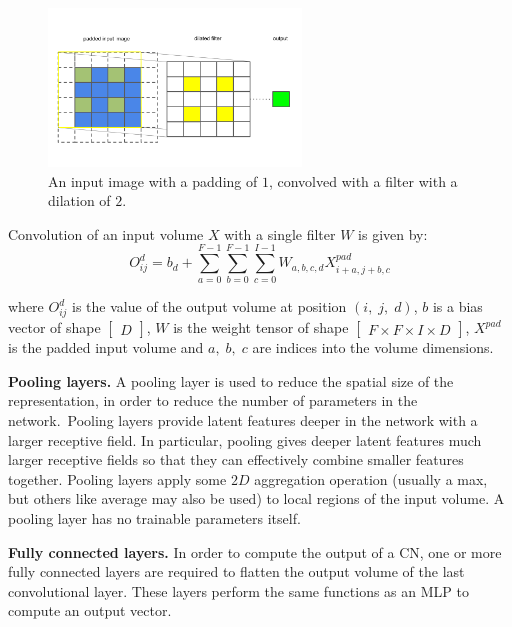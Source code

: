 \begin{figure}[H]
   	\centering
    	\includegraphics[width=0.6\textwidth, height=0.3\textwidth]{padding_and_dilation}
	\captionsetup{justification=centering}
	\caption{An input image with a padding of $ 1 $, convolved with a filter with a dilation of $ 2 $.}
\end{figure}

\noindent Convolution of an input volume $ X $ with a single filter $ W $ is given by: 
\begin{equation}
	O_{ij}^{d} = b_d + \sum_{a=0}^{F - 1}\sum_{b=0}^{F - 1}\sum_{c=0}^{I - 1}W_{a,b,c,d}X_{i+a,j+b,c}^{pad}
\end{equation}

\noindent where $ O_{ij}^d $ is the value of the output volume at position $ (i, \; j, \; d) $, $ b $ is a bias vector of shape $\left [ \begin{matrix} D \end{matrix} \right]$, $ W $ is the weight tensor of shape $ \left [ \begin{matrix} F \times F \times I \times D \end{matrix} \right] $, $ X^{pad} $ is the padded input volume and $ a, \; b, \; c $ are indices into the volume dimensions. \par

\noindent \textbf{Pooling layers.} A pooling layer is used to reduce the spatial size of the representation, in order to reduce the number of parameters in the network.\ Pooling layers provide latent features deeper in the network with a larger receptive field. In particular, pooling gives deeper latent features much larger receptive fields so that they can effectively combine smaller features together. Pooling layers apply some $ 2D $ aggregation operation (usually a max, but others like average may also be used) to local regions of the input volume. A pooling layer has no trainable parameters itself. \par

\noindent \textbf{Fully connected layers.} In order to compute the output of a CN, one or more fully connected layers are required to flatten the output volume of the last convolutional layer. These layers perform the same functions as an MLP to compute an output vector. \par

